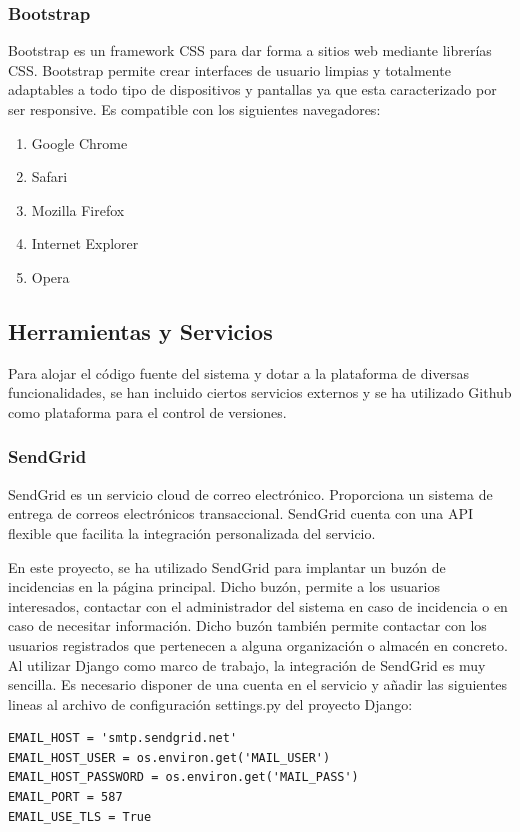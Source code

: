 \documentclass[a4paper,11pt]{book}
\begin{document}
\subsubsection{Bootstrap}
Bootstrap\cite{boo} es un framework CSS para dar forma a sitios web mediante librerías CSS. Bootstrap  permite crear interfaces de usuario limpias y totalmente adaptables a todo tipo de dispositivos y pantallas ya que esta caracterizado por ser responsive. Es compatible con los siguientes navegadores: 

\begin{enumerate}
\item Google Chrome
\item Safari
\item Mozilla Firefox 
\item Internet Explorer 
\item Opera  
\end{enumerate}
  
\subsection{Herramientas y Servicios}
Para alojar el código fuente del sistema y dotar a la plataforma de diversas funcionalidades, se han incluido ciertos servicios externos y se ha utilizado Github como plataforma para el control de versiones. 

\subsubsection{SendGrid}
SendGrid\cite{sg} es un servicio cloud de correo electrónico. Proporciona un sistema de entrega de correos electrónicos transaccional. SendGrid cuenta con una API flexible que facilita la integración personalizada del servicio. 
 

En este proyecto, se ha utilizado SendGrid para implantar un buzón de incidencias en la página principal. Dicho buzón, permite a los usuarios interesados, contactar con el administrador del sistema en caso de incidencia o en caso de necesitar información. Dicho buzón también permite contactar con los usuarios registrados que pertenecen a alguna organización o almacén en concreto. Al utilizar Django como marco de trabajo, la integración de SendGrid es muy sencilla. Es necesario disponer de una cuenta en el servicio y añadir las siguientes lineas al archivo de configuración settings.py del proyecto Django:

\begin{lstlisting}
EMAIL_HOST = 'smtp.sendgrid.net'
EMAIL_HOST_USER = os.environ.get('MAIL_USER')
EMAIL_HOST_PASSWORD = os.environ.get('MAIL_PASS')
EMAIL_PORT = 587
EMAIL_USE_TLS = True
\end{lstlisting}
\end{document}
